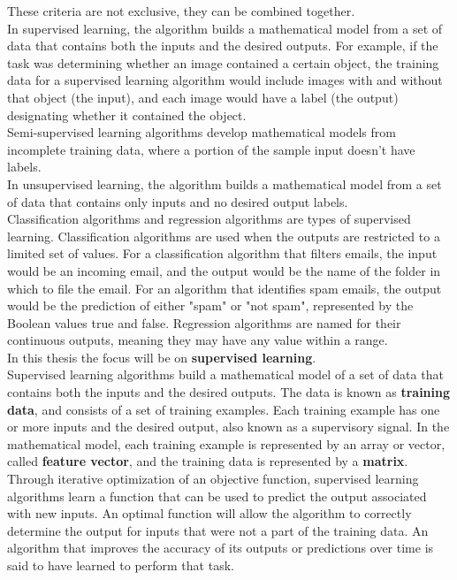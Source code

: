 These criteria are not exclusive, they can be combined together.
\\ \indent
In supervised learning, the algorithm builds a mathematical model from a set of data that contains both the inputs and the desired outputs. For example, if the task was determining whether an image contained a certain object, the training data for a supervised learning algorithm would include images with and without that object (the input), and each image would have a label (the output) designating whether it contained the object.
\\
Semi-supervised learning algorithms develop mathematical models from incomplete training data, where a portion of the sample input doesn't have labels.
\\
In unsupervised learning, the algorithm builds a mathematical model from a set of data that contains only inputs and no desired output labels.
\\ \indent
Classification algorithms and regression algorithms are types of supervised learning. Classification algorithms are used when the outputs are restricted to a limited set of values. For a classification algorithm that filters emails, the input would be an incoming email, and the output would be the name of the folder in which to file the email. For an algorithm that identifies spam emails, the output would be the prediction of either "spam" or "not spam", represented by the Boolean values true and false. Regression algorithms are named for their continuous outputs, meaning they may have any value within a range.
\\
In this thesis the focus will be on \textbf{supervised learning}.
\\ \indent
Supervised learning algorithms build a mathematical model of a set of data that contains both the inputs and the desired outputs. The data is known as \textbf{training data}, and consists of a set of training examples. Each training example has one or more inputs and the desired output, also known as a supervisory signal. In the mathematical model, each training example is represented by an array or vector, called \textbf{feature vector}, and the training data is represented by a \textbf{matrix}. Through iterative optimization of an objective function, supervised learning algorithms learn a function that can be used to predict the output associated with new inputs. An optimal function will allow the algorithm to correctly determine the output for inputs that were not a part of the training data. An algorithm that improves the accuracy of its outputs or predictions over time is said to have learned to perform that task.
